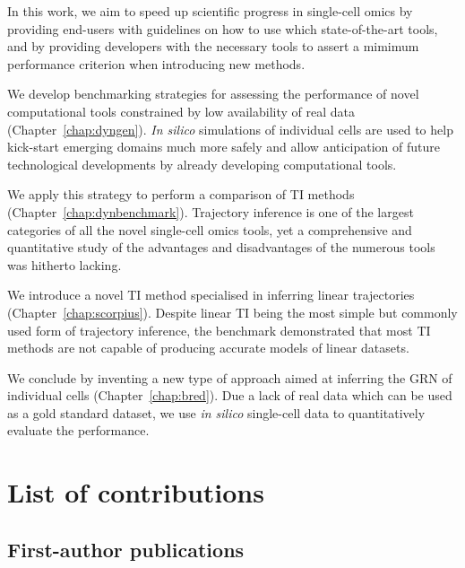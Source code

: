 In this work, we aim to speed up scientific progress in single-cell omics by providing end-users with guidelines on how to use which state-of-the-art tools, and by providing developers with the necessary tools to assert a mimimum performance criterion when introducing new methods.

We develop benchmarking strategies for assessing the performance of novel computational tools constrained by low availability of real data (Chapter~\ref{chap:dyngen}). \textit{In silico} simulations of individual cells are used to help kick-start emerging domains much more safely and allow anticipation of future technological developments by already developing computational tools.

We apply this strategy to perform a comparison of TI methods (Chapter~\ref{chap:dynbenchmark}). Trajectory inference is one of the largest categories of all the novel single-cell omics tools, yet a comprehensive and quantitative study of the advantages and disadvantages of the numerous tools was hitherto lacking. 

We introduce a novel TI method specialised in inferring linear trajectories (Chapter~\ref{chap:scorpius}).
Despite linear TI being the most simple but commonly used form of trajectory inference, the benchmark demonstrated that most TI methods are not capable of producing accurate models of linear datasets.

We conclude by inventing a new type of approach aimed at inferring the GRN of individual cells (Chapter~\ref{chap:bred}).
Due a lack of real data which can be used as a gold standard dataset, we use \textit{in silico} single-cell data to quantitatively evaluate the performance.


\section{List of contributions}

\subsection{First-author publications}


